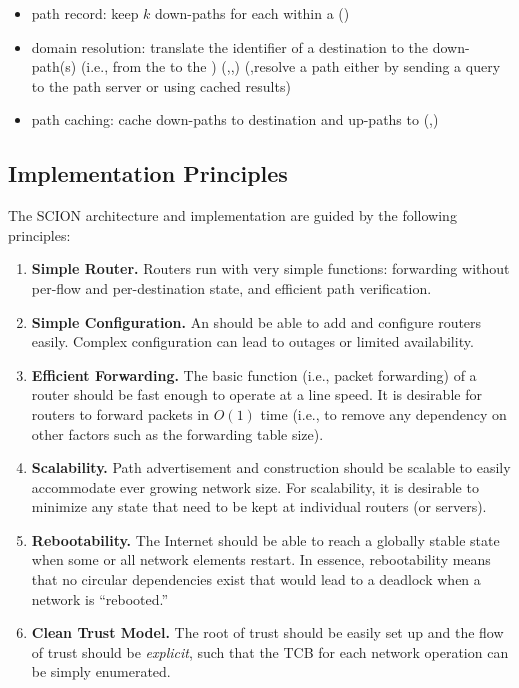 \begin{itemize}
\item path record: keep $k$ down-paths for each \AD within a \TD (\TAD)
\item domain resolution: translate the identifier of a destination \AD to the down-path(s) (i.e., from the \TDC to the \AD) (\CAD,\TAD,\EAD) (\TAD,\EAD resolve a path either by sending a query to the \TDC path server or using cached results) 
\item path caching: cache down-paths to destination \ADs and up-paths to \TDC (\TAD,\EAD)
\end{itemize}


\subsection{Implementation Principles}
The SCION architecture and implementation are guided by the following principles:

\begin{enumerate}
\item {\bf Simple Router. }
Routers run with very simple functions: forwarding without per-flow and per-destination state, and efficient path verification.


\item {\bf Simple Configuration. }
An \AD should be able to add and configure routers easily. Complex configuration
can lead to outages or limited availability.


\item {\bf Efficient Forwarding. }
The basic function (i.e., packet forwarding) of a router should be fast enough to operate at a line speed. It is desirable for routers to forward packets in $O(1)$ time (i.e., to remove any dependency on other factors such as the forwarding table size). 

\item {\bf Scalability. }
Path advertisement and construction should be scalable to easily accommodate ever growing network size. For scalability, it is desirable to minimize any state that need to be kept at individual routers (or servers).

\item {\bf Rebootability. } The Internet should be able to reach a globally
  stable state when some or all network elements restart. In essence,
  rebootability means that no circular dependencies exist that would lead to a
  deadlock when a network is ``rebooted.''

\item {\bf Clean Trust Model. } The root of trust should be easily set up and
  the flow of trust should be {\em explicit}, such that the TCB for each network
  operation can be simply enumerated.

\end{enumerate}

